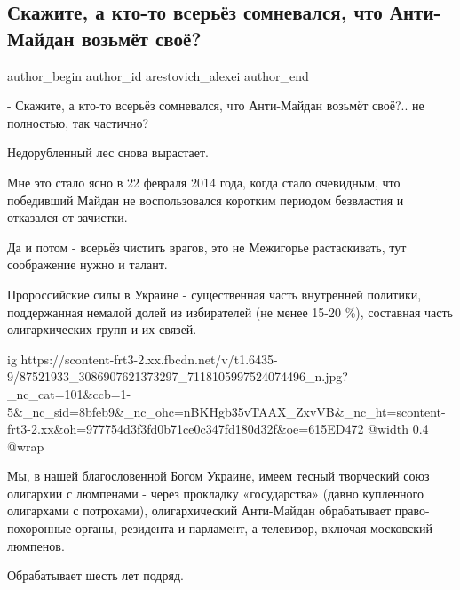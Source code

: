  
 
 
 
 
 
\subsection{Скажите, а кто-то всерьёз сомневался, что Анти-Майдан возьмёт своё?}
\label{sec:27_02_2020.fb.arestovich_alexei.1.antimaidan}
 
\ifcmt
 author_begin
   author_id arestovich_alexei
 author_end
\fi

- Скажите, а кто-то всерьёз сомневался, что Анти-Майдан возьмёт своё?.. не
полностью, так частично?

Недорубленный лес снова вырастает.

Мне это стало ясно в 22 февраля 2014 года, когда стало очевидным, что
победивший Майдан не воспользовался коротким периодом безвластия и отказался от
зачистки. 

Да и потом - всерьёз чистить врагов, это не Межигорье растаскивать, тут
соображение нужно и талант.

Пророссийские силы в Украине - существенная часть внутренней политики,
поддержанная немалой долей из избирателей (не менее 15-20 \%), составная часть
олигархических групп и их связей.

\ifcmt
  ig https://scontent-frt3-2.xx.fbcdn.net/v/t1.6435-9/87521933_3086907621373297_7118105997524074496_n.jpg?_nc_cat=101&ccb=1-5&_nc_sid=8bfeb9&_nc_ohc=nBKHgb35vTAAX_ZxvVB&_nc_ht=scontent-frt3-2.xx&oh=977754d3f3fd0b71ce0c347fd180d32f&oe=615ED472
  @width 0.4
  @wrap \parpic[r]
\fi

Мы, в нашей благословенной Богом Украине, имеем тесный творческий союз
олигархии с люмпенами - через прокладку «государства» (давно купленного
олигархами с потрохами), олигархический Анти-Майдан обрабатывает
право-похоронные органы, резидента и парламент, а телевизор, включая московский
- люмпенов.

Обрабатывает шесть лет подряд.

